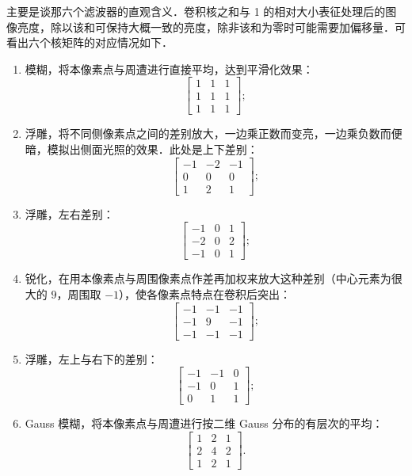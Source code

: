 \documentclass[12pt,a4paper,twoside]{ctexart}
\numberwithin{figure}{section}
\numberwithin{equation}{section}
\begin{document}
主要是谈那六个滤波器的直观含义．卷积核之和与 1 
的相对大小表征处理后的图像亮度，除以该和可保持大概一致的亮度，除非该和为零时可能需要加偏移量．可看出六个核矩阵的对应情况如下．
\begin{enumerate}
    \item 模糊，将本像素点与周遭进行直接平均，达到平滑化效果：
    \[\left[\begin{array}{ccc}1 & 1 & 1 \\ 1 & 1 & 1 \\ 1 & 1 & 1\end{array}\right];\]
    \item 浮雕，将不同侧像素点之间的差别放大，一边乘正数而变亮，一边乘负数而便暗，模拟出侧面光照的效果．此处是上下差别：
    \[\left[\begin{array}{ccc}-1 & -2 & -1 \\ 0 & 0 & 0 \\ 1 & 2 & 1\end{array}\right];\]
    \item 浮雕，左右差别：
    \[\left[\begin{array}{ccc}-1 & 0 & 1 \\ -2 & 0 & 2 \\ -1 & 0 & 1\end{array}\right];\]
    \item 锐化，在用本像素点与周围像素点作差再加权来放大这种差别（中心元素为很大的 $9$，周围取 $-1$），使各像素点特点在卷积后突出：
    \[\left[\begin{array}{ccc}-1 & -1 & -1 \\ -1 & 9 & -1 \\ -1 & -1 & -1\end{array}\right];\]
    \item 浮雕，左上与右下的差别：
    \[\left[\begin{array}{ccc}-1 & -1 & 0 \\ -1 & 0 & 1 \\ 0 & 1 & 1\end{array}\right];\]
    \item Gauss 模糊，将本像素点与周遭进行按二维 Gauss 分布的有层次的平均：
    \[\left[\begin{array}{ccc}1 & 2 & 1 \\ 2 & 4 & 2 \\ 1 & 2 & 1\end{array}\right].\]
\end{enumerate}
\end{document}
